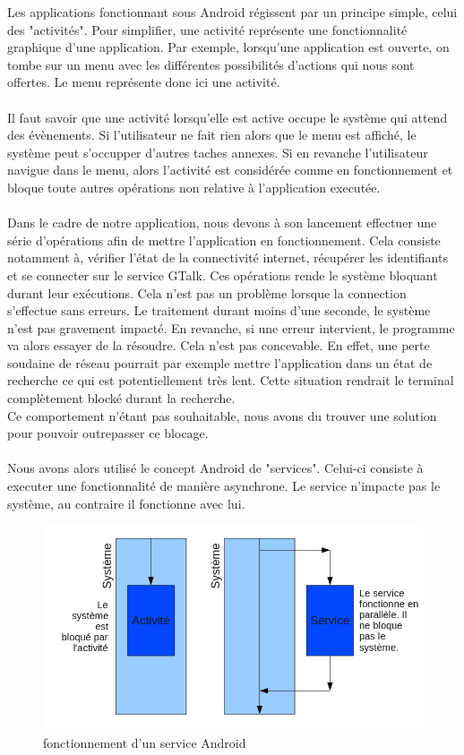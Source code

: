 Les applications fonctionnant sous Android régissent par un principe simple, celui des "activités".
Pour simplifier, une activité représente une fonctionnalité graphique d'une application. Par exemple,
lorsqu'une application est ouverte, on tombe sur un menu avec les différentes possibilités d'actions 
qui nous sont offertes. Le menu représente donc ici une activité. 
\\\\
Il faut savoir que une activité lorsqu'elle est active occupe le système qui attend des évènements.
Si l'utilisateur ne fait rien alors que le menu est affiché, le système peut s'occupper d'autres 
taches annexes. Si en revanche l'utilisateur navigue dans le menu, alors l'activité est considérée
comme en fonctionnement et bloque toute autres opérations non relative à l'application executée.
\\\\
Dans le cadre de notre application, nous devons à son lancement effectuer une série d'opérations 
afin de mettre l'application en fonctionnement. Cela consiste notamment à, vérifier l'état de la 
connectivité internet, récupérer les identifiants et se connecter sur le service GTalk. Ces 
opérations rende le système bloquant durant leur exécutions. Cela n'est pas un problème lorsque la 
connection s'effectue sans erreurs. Le traitement durant moins d'une seconde, le système n'est pas
gravement impacté. En revanche, si une erreur intervient, le programme va alors essayer de la résoudre.
Cela n'est pas concevable. En effet, une perte soudaine de réseau pourrait par exemple mettre 
l'application dans un état de recherche ce qui est potentiellement très lent. Cette situation rendrait
le terminal complètement blocké durant la recherche. 
\\
Ce comportement n'étant pas souhaitable, nous avons du trouver une solution pour pouvoir outrepasser ce blocage.
\\\\
Nous avons alors utilisé le concept Android de "services". Celui-ci consiste à executer une fonctionnalité 
de manière asynchrone. Le service n'impacte pas le système, au contraire il fonctionne avec lui. 

\begin{figure}[!h]
	\center
	\includegraphics[width=13cm]{img/fonctionnement-des-services-android.png}
	\caption{fonctionnement d'un service Android}
\end{figure}

